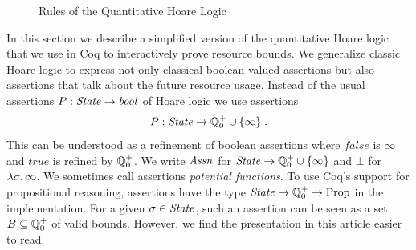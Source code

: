 \documentclass{sigplanconf}
\begin{document}
{\begin{figure}

\caption{Rules of the Quantitative Hoare Logic}
\label{fig:logicapp}
\end{figure}

In this section we describe a simplified version of the quantitative
Hoare logic that we use in Coq to interactively prove resource bounds.
%
We generalize classic Hoare logic to express not only classical
boolean-valued assertions but also assertions that talk about the
future resource usage.  Instead of the usual assertions $P : \mathit{State}
\to \mathit{bool}$ of Hoare logic we use assertions
$$
P : \mathit{State} \to \mathbb Q^+_0 \cup \{ \infty \} \; .
$$
This can be understood as a refinement of boolean assertions where
$\mathit{false}$ is $\infty$ and $\mathit{true}$ is refined by $\mathbb Q^+_0$.
We write $\mathit{Assn}$ for $\mathit{State} \to \mathbb Q^+_0 \cup \{ \infty \}$ and $\bot$ for
$\lambda \sigma . \, \infty$.  We sometimes call assertions
\emph{potential functions}.  To use Coq's support for propositional
reasoning, assertions have the type $\mathit{State} \to \mathbb Q^+_0 \to \mathrm{Prop}$
in the implementation.  For a given $\sigma \in \mathit{State}$, such an
assertion can be seen as a set $B \subseteq \mathbb Q^+_0$ of valid bounds.
However, we find the presentation in this article easier to read.

}
\end{document}
